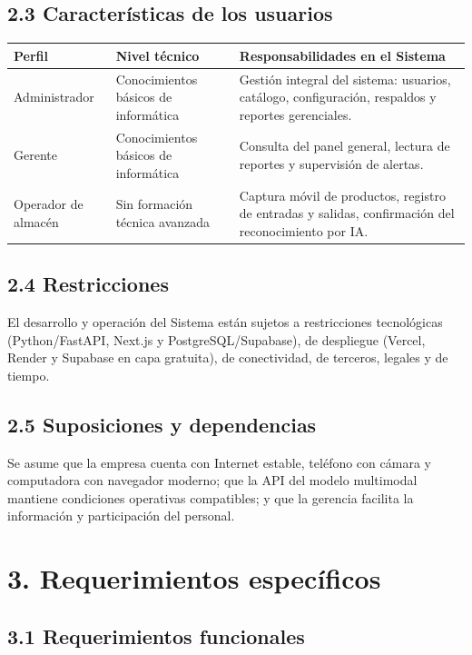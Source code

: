 \documentclass[12pt, letterpaper]{report}
\begin{document}
\subsection*{2.3 Características de los usuarios}

\noindent
\begin{tabular}{|p{2.8cm}|p{4.5cm}|p{6.0cm}|}
\hline
\textbf{Perfil} & \textbf{Nivel técnico} & \textbf{Responsabilidades en el Sistema} \\
\hline
Administrador & Conocimientos básicos de informática & Gestión integral del sistema: usuarios, catálogo, configuración, respaldos y reportes gerenciales. \\
\hline
Gerente & Conocimientos básicos de informática & Consulta del panel general, lectura de reportes y supervisión de alertas. \\
\hline
Operador de almacén & Sin formación técnica avanzada & Captura móvil de productos, registro de entradas y salidas, confirmación del reconocimiento por IA. \\
\hline
\end{tabular}

\subsection*{2.4 Restricciones}

El desarrollo y operación del Sistema están sujetos a restricciones
tecnológicas (Python/FastAPI, Next.js y PostgreSQL/Supabase), de
despliegue (Vercel, Render y Supabase en capa gratuita), de
conectividad, de terceros, legales y de tiempo.

\subsection*{2.5 Suposiciones y dependencias}

Se asume que la empresa cuenta con Internet estable, teléfono con
cámara y computadora con navegador moderno; que la API del modelo
multimodal mantiene condiciones operativas compatibles; y que la
gerencia facilita la información y participación del personal.

\section*{3. Requerimientos específicos}

\subsection*{3.1 Requerimientos funcionales}
\end{document}
